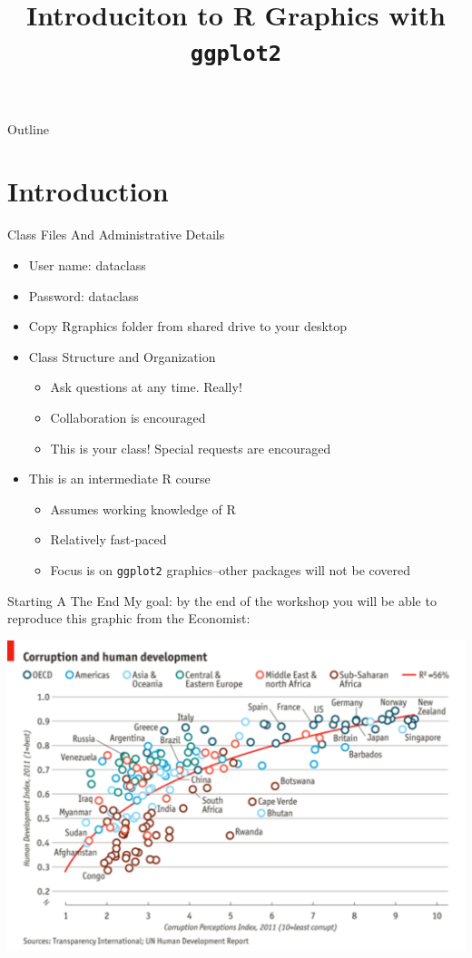 \documentclass[table,smaller]{beamer}
\author{}
\date{}
\title{Introduciton to R Graphics with \texttt{ggplot2}}
\begin{document}
\maketitle
\begin{frame}{Outline}
\tableofcontents
\end{frame}



\section{Introduction}
\label{sec-1}

\begin{frame}[fragile,label=sec-1-1]{Class Files And Administrative Details}
 \begin{itemize}
\item User name: dataclass
\item Password: dataclass
\item Copy \alert{Rgraphics} folder from shared drive to your desktop
\item Class Structure and Organization
\begin{itemize}
\item Ask questions at any time. Really!
\item Collaboration is encouraged
\item This is your class! Special requests are encouraged
\end{itemize}
\item This is an intermediate R course
\begin{itemize}
\item Assumes working knowledge of R
\item Relatively fast-paced
\item Focus is on \texttt{ggplot2} graphics--other packages will not be covered
\end{itemize}
\end{itemize}
\end{frame}

\begin{frame}[label=sec-1-2]{Starting A The End}
My goal: by the end of the workshop you will be able to reproduce this graphic from the Economist:

\includegraphics[width=.9\linewidth]{images/Economist1.pdf}
\end{frame}
\end{document}
